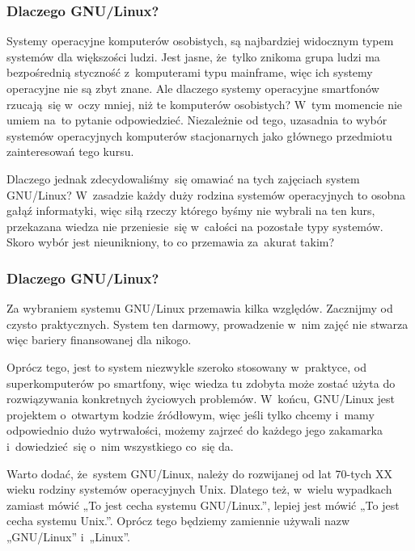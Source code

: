 \documentclass[10pt,t]{beamer}
\begin{document}
\begin{frame}
  \frametitle{Dlaczego GNU/Linux?}


  Systemy operacyjne komputerów osobistych, są najbardziej widocznym typem
  systemów dla większości ludzi. Jest jasne, że~tylko znikoma grupa ludzi
  ma bezpośrednią styczność z~komputerami typu mainframe, więc ich systemy
  operacyjne nie są zbyt znane. Ale dlaczego systemy operacyjne smartfonów
  rzucają~się w~oczy mniej, niż te komputerów osobistych? W~tym momencie
  nie umiem na~to pytanie odpowiedzieć. Niezależnie od tego, uzasadnia to
  wybór systemów operacyjnych komputerów stacjonarnych jako głównego
  przedmiotu zainteresowań tego kursu.

  Dlaczego jednak zdecydowaliśmy~się omawiać na tych zajęciach system
  GNU/Linux? W~zasadzie każdy duży rodzina systemów operacyjnych to osobna
  gałąź informatyki, więc siłą rzeczy którego byśmy nie wybrali na ten kurs,
  przekazana wiedza nie przeniesie~się w~całości na pozostałe typy systemów.
  Skoro wybór jest nieunikniony, to co przemawia za~akurat takim?

\end{frame}





\begin{frame}
  \frametitle{Dlaczego GNU/Linux?}


  Za wybraniem systemu GNU/Linux przemawia kilka względów. Zacznijmy od
  czysto praktycznych. System ten darmowy, prowadzenie w~nim zajęć nie
  stwarza więc bariery finansowanej dla nikogo.

  Oprócz tego, jest to system niezwykle szeroko stosowany w~praktyce, od
  superkomputerów po smartfony, więc wiedza tu zdobyta może zostać użyta
  do rozwiązywania konkretnych życiowych problemów. W~końcu, GNU/Linux
  jest projektem o~otwartym kodzie źródłowym, więc jeśli tylko chcemy
  i~mamy odpowiednio dużo wytrwałości, możemy zajrzeć do każdego jego
  zakamarka i~dowiedzieć~się o~nim wszystkiego co~się da.

  Warto dodać, że~system GNU/Linux, należy do rozwijanej od lat 70-tych XX
  wieku rodziny systemów operacyjnych Unix. Dlatego też, w~wielu wypadkach
  zamiast mówić „To jest cecha systemu GNU/Linux.”, lepiej jest mówić „To
  jest cecha systemu Unix.”. Oprócz tego będziemy zamiennie używali
  nazw „GNU/Linux” i~„Linux”.

\end{frame}
\end{document}
